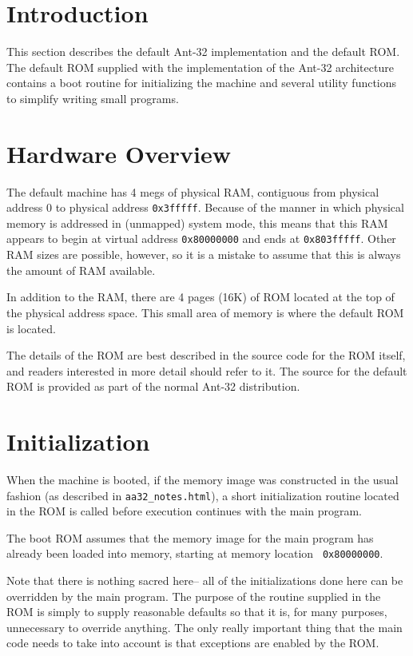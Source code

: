 
\section{Introduction}

This section describes the default Ant-32 implementation and the
default ROM.  The default ROM supplied with the implementation of the
Ant-32 architecture contains a boot routine for initializing the
machine and several utility functions to simplify writing small
programs.

\section{Hardware Overview}

The default machine has 4 megs of physical RAM, contiguous from
physical address 0 to physical address {\tt 0x3fffff}.  Because of the
manner in which physical memory is addressed in (unmapped) system
mode, this means that this RAM appears to begin at virtual address
{\tt 0x80000000} and ends at {\tt 0x803fffff}.  Other RAM sizes are
possible, however, so it is a mistake to assume that this is always
the amount of RAM available.

In addition to the RAM, there are 4 pages (16K) of ROM located at the
top of the physical address space.  This small area of memory is where
the default ROM is located.

The details of the ROM are best described in the source code for the
ROM itself, and readers interested in more detail should refer to it. 
The source for the default ROM is provided as part of the normal
Ant-32 distribution.

\section{Initialization}

When the machine is booted, if the memory image was constructed in the
usual fashion (as described in {\tt aa32\_notes.html}), a short
initialization routine located in the ROM is called before execution
continues with the main program.

The boot ROM assumes that the memory image for the main program has
already been loaded into memory, starting at memory location {\tt
0x80000000}.

Note that there is nothing sacred here-- all of the initializations
done here can be overridden by the main program.  The purpose of the
routine supplied in the ROM is simply to supply reasonable defaults so
that it is, for many purposes, unnecessary to override anything.  The
only really important thing that the main code needs to take into
account is that exceptions are enabled by the ROM.

